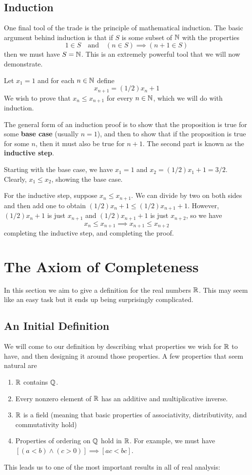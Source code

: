\subsection*{Induction}
One final tool of the trade is the principle of mathematical induction. The basic argument behind induction is that if $S$ is some subset of $\mathbb{N}$ with the properties
\[ 1\in S \quad\text{and}\quad  (n \in S)\implies (n+1\in S)\]
then we must have $S = \mathbb{N}$. This is an extremely powerful tool that we will now demonstrate.
\begin{example}
    Let $x_1 = 1$ and for each $n\in \mathbb{N}$ define
    \[ x_{n+1} = (1/2)x_n + 1\]
    We wish to prove that $x_n \leq x_{n+1}$ for every $n\in \mathbb{N}$, which we will do with induction.

    The general form of an induction proof is to show that the proposition is true for some \textbf{base case} (usually $n=1$), and then to show that if the proposition is true for some $n$, then it must also be true for $n+1$. The second part is known as the \textbf{inductive step}. 

    Starting with the base case, we have $x_1 = 1$ and $x_2 = (1/2)x_1 + 1 = 3/2$. Clearly, $x_1 \leq x_2$, showing the base case.

    For the inductive step, suppose $x_n \leq x_{n+1}$. We can divide by two on both sides and then add one to obtain $(1/2)x_n + 1 \leq (1/2)x_{n+1} + 1$. However, $(1/2)x_n + 1$ is just $x_{n+1}$ and $(1/2)x_{n+1} + 1$ is just $x_{n+2}$, so we have
    \[ x_n \leq x_{n+1} \implies x_{n+1} \leq x_{n+2} \]
    completing the inductive step, and completing the proof. 
\end{example}
\section{The Axiom of Completeness}
In this section we aim to give a definition for the real numbers $\mathbb{R}$. This may seem like an easy task but it ends up being surprisingly complicated. 
\subsection*{An Initial Definition}
We will come to our definition by describing what properties we wish for $\mathbb{R}$ to have, and then designing it around those properties. A few properties that seem natural are
\begin{enumerate}
    \item $\mathbb{R}$ contains $\mathbb{Q}$.
    \item Every nonzero element of $\mathbb{R}$ has an additive and multiplicative inverse.
    \item $\mathbb{R}$ is a field (meaning that basic properties of associativity, distributivity, and commutativity hold)
    \item Properties of ordering on $\mathbb{Q}$ hold in $\mathbb{R}$. For example, we must have $[(a < b)\land (c>0)] \implies [ac < bc]$.
\end{enumerate}
This leads us to one of the most important results in all of real analysis:

